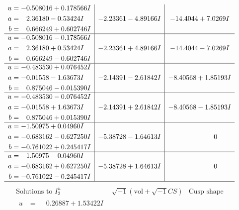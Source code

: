 \documentclass[1p]{elsarticle_modified}
\theoremstyle{definition}
\newcommand{\I}{\sqrt{-1}}
\begin{document}
$$\begin{array}{c|c|c}
\begin{aligned}
u &= -0.508016 + 0.178566 I \\
a &= \phantom{-}2.36180 - 0.53424 I \\
b &= \phantom{-}0.666249 + 0.602746 I\end{aligned}
 & -2.23361 - 4.89166 I & -14.4044 + 7.0269 I \\ \hline\begin{aligned}
u &= -0.508016 - 0.178566 I \\
a &= \phantom{-}2.36180 + 0.53424 I \\
b &= \phantom{-}0.666249 - 0.602746 I\end{aligned}
 & -2.23361 + 4.89166 I & -14.4044 - 7.0269 I \\ \hline\begin{aligned}
u &= -0.483530 + 0.076452 I \\
a &= -0.01558 - 1.63673 I \\
b &= \phantom{-}0.875046 - 0.015390 I\end{aligned}
 & -2.14391 - 2.61842 I & -8.40568 + 1.85193 I \\ \hline\begin{aligned}
u &= -0.483530 - 0.076452 I \\
a &= -0.01558 + 1.63673 I \\
b &= \phantom{-}0.875046 + 0.015390 I\end{aligned}
 & -2.14391 + 2.61842 I & -8.40568 - 1.85193 I \\ \hline\begin{aligned}
u &= -1.50975 + 0.04960 I \\
a &= -0.683162 - 0.627250 I \\
b &= -0.761022 + 0.245417 I\end{aligned}
 & -5.38728 - 1.64613 I & \phantom{-0.000000 } 0 \\ \hline\begin{aligned}
u &= -1.50975 - 0.04960 I \\
a &= -0.683162 + 0.627250 I \\
b &= -0.761022 - 0.245417 I\end{aligned}
 & -5.38728 + 1.64613 I & \phantom{-0.000000 } 0\\
 \hline 
 \end{array}$$\newpage$$\begin{array}{c|c|c}  
\text{Solutions to }I^u_{2}& \I (\text{vol} + \sqrt{-1}CS) & \text{Cusp shape}\\
 \hline 
\begin{aligned}
u &= \phantom{-}0.26887 + 1.53422 I \\

\end{aligned}
\end{array}$$
\end{document}

